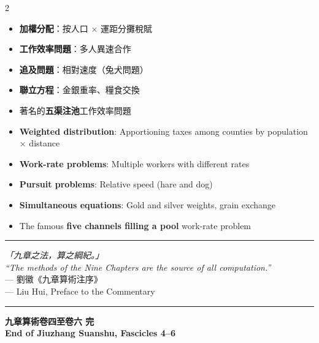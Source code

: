 \documentclass[10pt,a4paper]{article}
\newcommand{\shortline}{\noindent\rule{0.5\textwidth}{0.4pt}\par}
\begin{document}
\begin{paracol}{2}
\begin{leftcolumn*}
\begin{itemize}[leftmargin=1.2em,topsep=1pt,itemsep=1pt]
  \item \textbf{加權分配}：按人口 $\times$ 運距分攤稅賦
  \item \textbf{工作效率問題}：多人異速合作
  \item \textbf{追及問題}：相對速度（兔犬問題）
  \item \textbf{聯立方程}：金銀重率、糧食交換
  \item 著名的\textbf{五渠注池}工作效率問題
\end{itemize}
\end{leftcolumn*}
\begin{rightcolumn*}
\begin{itemize}[leftmargin=1.2em,topsep=1pt,itemsep=1pt]
  \item \textbf{Weighted distribution}: Apportioning taxes among counties by population $\times$ distance
  \item \textbf{Work-rate problems}: Multiple workers with different rates
  \item \textbf{Pursuit problems}: Relative speed (hare and dog)
  \item \textbf{Simultaneous equations}: Gold and silver weights, grain exchange
  \item The famous \textbf{five channels filling a pool} work-rate problem
\end{itemize}
\end{rightcolumn*}
\end{paracol}

\vspace{0.8cm}

\begin{center}
\shortline
\vspace{0.4cm}

\textit{「九章之法，算之綱紀。」}\\
\textit{``The methods of the Nine Chapters are the source of all computation.''}\\
--- 劉徽《九章算術注序》\\
--- Liu Hui, Preface to the Commentary

\vspace{0.4cm}
\shortline
\end{center}

\vspace{0.8cm}

\begin{center}
\textbf{九章算術卷四至卷六 完}\\[0.3em]
\textbf{End of Jiuzhang Suanshu, Fascicles 4--6}
\end{center}
\end{document}
